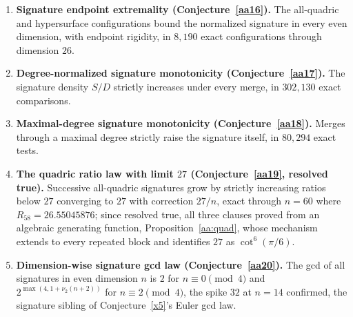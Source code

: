 \documentclass[11pt]{article}
\theoremstyle{definition}
\begin{document}
\begin{enumerate}
\item \textbf{Signature endpoint extremality (Conjecture~\ref{aa16}).}  The all-quadric and hypersurface configurations bound the normalized signature in every even dimension, with endpoint rigidity, in $8{,}190$ exact configurations through dimension $26$.
\item \textbf{Degree-normalized signature monotonicity (Conjecture~\ref{aa17}).}  The signature density $S/D$ strictly increases under every merge, in $302{,}130$ exact comparisons.
\item \textbf{Maximal-degree signature monotonicity (Conjecture~\ref{aa18}).}  Merges through a maximal degree strictly raise the signature itself, in $80{,}294$ exact tests.
\item \textbf{The quadric ratio law with limit $27$ (Conjecture~\ref{aa19}, resolved true).}  Successive all-quadric signatures grow by strictly increasing ratios below $27$ converging to $27$ with correction $27/n$, exact through $n=60$ where $R_{58}=26.55045876$; since resolved true, all three clauses proved from an algebraic generating function, Proposition~\ref{aa:quad}, whose mechanism extends to every repeated block and identifies $27$ as $\cot^6(\pi/6)$.
\item \textbf{Dimension-wise signature gcd law (Conjecture~\ref{aa20}).}  The gcd of all signatures in even dimension $n$ is $2$ for $n\equiv0\pmod4$ and $2^{\max(4,1+\nu_2(n+2))}$ for $n\equiv2\pmod4$, the spike $32$ at $n=14$ confirmed, the signature sibling of Conjecture~\ref{x5}'s Euler gcd law.
\end{enumerate}
\end{document}
